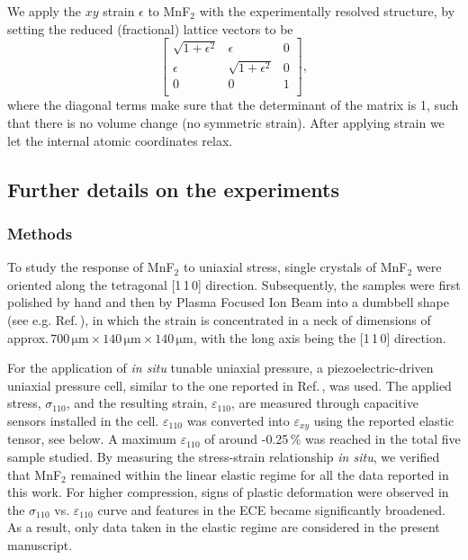 \documentclass[
 reprint,










 amsmath,amssymb,
 aps,






]{revtex4-2}
\begin{document}
We apply the $xy$ strain $\epsilon$ to MnF$_2$ with the experimentally resolved structure, by setting the reduced (fractional) lattice vectors to be
\begin{equation}
    \begin{bmatrix}
    \sqrt{1+\epsilon^2} & \epsilon & 0 \\
    \epsilon & \sqrt{1+\epsilon^2} & 0 \\
    0 & 0 & 1 \\
    \end{bmatrix},
\end{equation}
where the diagonal terms make sure that the determinant of the matrix is 1, such that there is no volume change (no symmetric strain). After applying strain we let the internal atomic coordinates relax.


\subsection{Further details on the experiments}

\subsubsection{Methods}
\label{sec:exp-methods}

To study the response of MnF$_2$ to uniaxial stress, single crystals of MnF$_2$ were oriented along the tetragonal [1\,1\,0] direction. Subsequently, the samples were first polished by hand and then by Plasma Focused Ion Beam into a dumbbell shape (see e.g. Ref.\,\cite{Noa23}), in which the strain is concentrated in a neck of dimensions of approx.\,$700\,\mathrm{\mu m}\times140\,\mathrm{\mu m}\times140\,\mathrm{\mu m}$, with the long axis being the [1\,1\,0] direction.

For the application of \textit{in situ} tunable uniaxial pressure, a piezoelectric-driven uniaxial pressure cell, similar to the one reported in Ref.\,\cite{Bar19}, was used. The applied stress, $\sigma_{110}$, and the resulting strain, $\varepsilon_{110}$, are measured through capacitive sensors installed in the cell. $\varepsilon_{110}$ was converted into $\varepsilon_{xy}$ using the reported elastic tensor, see below. A maximum $\varepsilon_{110}$ of around -0.25\,\% was reached in the total five sample studied. By measuring the stress-strain relationship \textit{in situ}, we verified that MnF$_2$ remained within the linear elastic regime for all the data reported in this work. For higher compression, signs of plastic deformation were observed in the $\sigma_{110}$ vs. $\varepsilon_{110}$ curve and features in the ECE became significantly broadened. As a result, only data taken in the elastic regime are considered in the present manuscript.
\end{document}
